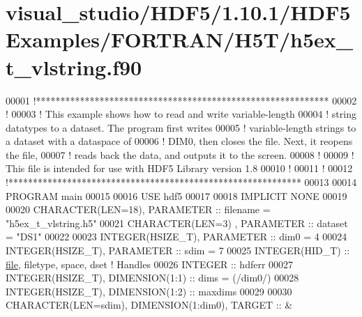 \hypertarget{visual__studio_2_h_d_f5_21_810_81_2_h_d_f5_examples_2_f_o_r_t_r_a_n_2_h5_t_2h5ex__t__vlstring_8f90_source}{}\section{visual\+\_\+studio/\+H\+D\+F5/1.10.1/\+H\+D\+F5\+Examples/\+F\+O\+R\+T\+R\+A\+N/\+H5\+T/h5ex\+\_\+t\+\_\+vlstring.f90}
\label{visual__studio_2_h_d_f5_21_810_81_2_h_d_f5_examples_2_f_o_r_t_r_a_n_2_h5_t_2h5ex__t__vlstring_8f90_source}

\begin{DoxyCode}
00001 \textcolor{comment}{!************************************************************}
00002 \textcolor{comment}{!}
00003 \textcolor{comment}{!  This example shows how to read and write variable-length}
00004 \textcolor{comment}{!  string datatypes to a dataset.  The program first writes}
00005 \textcolor{comment}{!  variable-length strings to a dataset with a dataspace of}
00006 \textcolor{comment}{!  DIM0, then closes the file.  Next, it reopens the file,}
00007 \textcolor{comment}{!  reads back the data, and outputs it to the screen.}
00008 \textcolor{comment}{!}
00009 \textcolor{comment}{!  This file is intended for use with HDF5 Library version 1.8}
00010 \textcolor{comment}{!}
00011 \textcolor{comment}{!}
00012 \textcolor{comment}{!************************************************************}
00013 
00014 \textcolor{keyword}{PROGRAM} main
00015 
00016   \textcolor{keywordtype}{USE }hdf5
00017   
00018   \textcolor{keywordtype}{IMPLICIT NONE}
00019 
00020   \textcolor{keywordtype}{CHARACTER(LEN=18)}, \textcolor{keywordtype}{PARAMETER} :: filename  = \textcolor{stringliteral}{"h5ex\_t\_vlstring.h5"}
00021   \textcolor{keywordtype}{CHARACTER(LEN=3)} , \textcolor{keywordtype}{PARAMETER} :: dataset   = \textcolor{stringliteral}{"DS1"}
00022 
00023   \textcolor{keywordtype}{INTEGER(HSIZE\_T)}, \textcolor{keywordtype}{PARAMETER} :: dim0      = 4
00024   \textcolor{keywordtype}{INTEGER(HSIZE\_T)}, \textcolor{keywordtype}{PARAMETER} :: sdim      = 7
00025   \textcolor{keywordtype}{INTEGER(HID\_T)}  :: \hyperlink{structfile}{file}, filetype, space, dset \textcolor{comment}{! Handles}
00026   \textcolor{keywordtype}{INTEGER} :: hdferr
00027   \textcolor{keywordtype}{INTEGER(HSIZE\_T)}, \textcolor{keywordtype}{DIMENSION(1:1)} :: dims = (/dim0/)
00028   \textcolor{keywordtype}{INTEGER(HSIZE\_T)}, \textcolor{keywordtype}{DIMENSION(1:2)} :: maxdims
00029   
00030   \textcolor{keywordtype}{CHARACTER(LEN=sdim)}, \textcolor{keywordtype}{DIMENSION(1:dim0)}, \textcolor{keywordtype}{TARGET} :: &

\end{DoxyCode}
